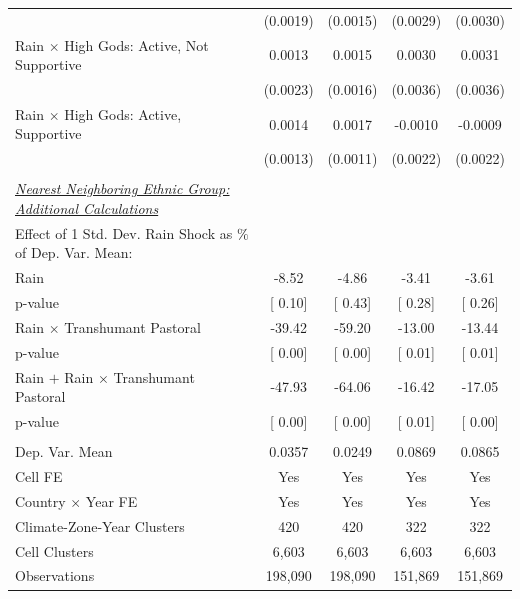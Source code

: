 {\begin{tabular}{l*{4}{c}}
                    &(0.0019)         &(0.0015)         &(0.0029)         &(0.0030)         \\
\addlinespace
\hspace{15pt}  Rain $\times$ High Gods: Active, Not Supportive&0.0013         &0.0015         &0.0030         &0.0031         \\
                    &(0.0023)         &(0.0016)         &(0.0036)         &(0.0036)         \\
\addlinespace
\hspace{15pt}  Rain $\times$ High Gods: Active, Supportive&0.0014         &0.0017\sym{*}  &-0.0010         &-0.0009         \\
                    &(0.0013)         &(0.0011)         &(0.0022)         &(0.0022)         \\
\midrule
\\ \underline{\emph{Nearest Neighboring Ethnic Group: Additional Calculations}} &               &               &               &               \\
[1em] Effect of 1 Std. Dev. Rain Shock as $\%$ of Dep. Var. Mean:&               &               &               &               \\
\hspace{15pt} Rain  & -8.52         & -4.86         & -3.41         & -3.61         \\
\hspace{15pt} p-value&[     0.10]         &[     0.43]         &[     0.28]         &[     0.26]         \\
[1em] \hspace{15pt} Rain $\times$ Transhumant Pastoral&-39.42         &-59.20         &-13.00         &-13.44         \\
\hspace{15pt} p-value&[     0.00]         &[     0.00]         &[     0.01]         &[     0.01]         \\
[1em]  \hspace{15pt} Rain $+$ Rain $\times$ Transhumant Pastoral&-47.93         &-64.06         &-16.42         &-17.05         \\
\hspace{15pt} p-value&[     0.00]         &[     0.00]         &[     0.01]         &[     0.00]         \\
\hline \\ Dep. Var. Mean&0.0357         &0.0249         &0.0869         &0.0865         \\
Cell FE             &   Yes         &   Yes         &   Yes         &   Yes         \\
Country $\times$ Year FE&   Yes         &   Yes         &   Yes         &   Yes         \\
Climate-Zone-Year Clusters&   420         &   420         &   322         &   322         \\
Cell Clusters       & 6,603         & 6,603         & 6,603         & 6,603         \\
Observations        &198,090         &198,090         &151,869         &151,869         \\
\bottomrule
\end{tabular}
}
